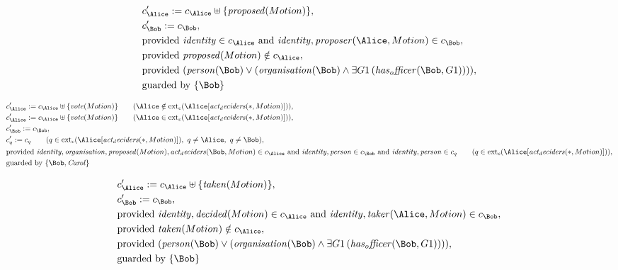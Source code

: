 \begin{align*}
&
c'_
{
\Alice
}
 := 
c_
{
\Alice
}
 \uplus 
\{
\mathit{
proposed
}
(
Motion
)
\}
,\\
&
c'_
{
\Bob
}
 := 
c_
{
\Bob
}
,\\
&
\text{provided } 
\mathit{
identity
}
 \in c_
{
\Alice
}
 \text{ and } 
\mathit{
identity
}
,
\mathit{
proposer
}
(
\Alice
,
Motion
)
 \in c_
{
\Bob
}
,\\
&
\text{provided } 
\mathit{
proposed
}
(
Motion
)
 \notin c_
{
\Alice
}
,\\
&
\text{provided } 
(
\mathit{
person
}
(
\Bob
)
\lor
(
\mathit{
organisation
}
(
\Bob
)
\land
\exists 
G1
\,(
\mathit{
has_officer
}
(
\Bob
,
G1
)
)
)
)
,\\
&
\text{guarded by } \{
\Bob
\}
\end{align*}

\begin{align*}
&
c'_
{
\Alice
}
 := 
c_
{
\Alice
}
 \uplus 
\{
\mathit{
vote
}
(
Motion
)
\}
 \qquad (
\Alice
 \notin 
\mathrm{ext}_c(
\Alice
[
\mathit{
act_deciders
}
(
\ast
,
Motion
)
]
)
)
,\\
&
c'_
{
\Alice
}
 := 
c_
{
\Alice
}
 \uplus 
\{
\mathit{
vote
}
(
Motion
)
\}
 \qquad (
\Alice
 \in 
\mathrm{ext}_c(
\Alice
[
\mathit{
act_deciders
}
(
\ast
,
Motion
)
]
)
)
,\\
&
c'_
{
\Bob
}
 := 
c_
{
\Bob
}
,\\
&
c'_
q
 := 
c_
q
 \qquad (
q
 \in 
\mathrm{ext}_c(
\Alice
[
\mathit{
act_deciders
}
(
\ast
,
Motion
)
]
)
,\ 
q \neq 
\Alice
,\ 
q \neq 
\Bob
)
,\\
&
\text{provided } 
\mathit{
identity
}
,
\mathit{
organisation
}
,
\mathit{
proposed
}
(
Motion
)
,
\mathit{
act_deciders
}
(
\Bob
,
Motion
)
 \in c_
{
\Alice
}
 \text{ and } 
\mathit{
identity
}
,
\mathit{
person
}
 \in c_
{
\Bob
}
 \text{ and } 
\mathit{
identity
}
,
\mathit{
person
}
 \in c_
q
 \qquad (
q \in 
\mathrm{ext}_c(
\Alice
[
\mathit{
act_deciders
}
(
\ast
,
Motion
)
]
)
)
,\\
&
\text{guarded by } \{
\Bob
,
\mathit{Carol}
\}
\end{align*}

\begin{align*}
&
c'_
{
\Alice
}
 := 
c_
{
\Alice
}
 \uplus 
\{
\mathit{
taken
}
(
Motion
)
\}
,\\
&
c'_
{
\Bob
}
 := 
c_
{
\Bob
}
,\\
&
\text{provided } 
\mathit{
identity
}
,
\mathit{
decided
}
(
Motion
)
 \in c_
{
\Alice
}
 \text{ and } 
\mathit{
identity
}
,
\mathit{
taker
}
(
\Alice
,
Motion
)
 \in c_
{
\Bob
}
,\\
&
\text{provided } 
\mathit{
taken
}
(
Motion
)
 \notin c_
{
\Alice
}
,\\
&
\text{provided } 
(
\mathit{
person
}
(
\Bob
)
\lor
(
\mathit{
organisation
}
(
\Bob
)
\land
\exists 
G1
\,(
\mathit{
has_officer
}
(
\Bob
,
G1
)
)
)
)
,\\
&
\text{guarded by } \{
\Bob
\}
\end{align*}
